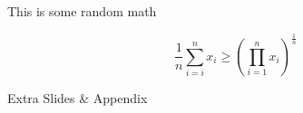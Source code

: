 \documentclass[11pt, aspectratio=169]{beamer} %
\begin{document}
\begin{frame}{This is some random math}

\begin{equation}
\frac{1}{n} \sum_{i=i}^{n} x_{i} \geq
\left(\prod _{i=1}^{n}x_{i}\right)^{\frac {1}{n}}
\end{equation}

\end{frame}




\appendix

{
\begin{frame}[standout]{}
		Extra Slides \& Appendix
	\end{frame}
}

\end{document}
